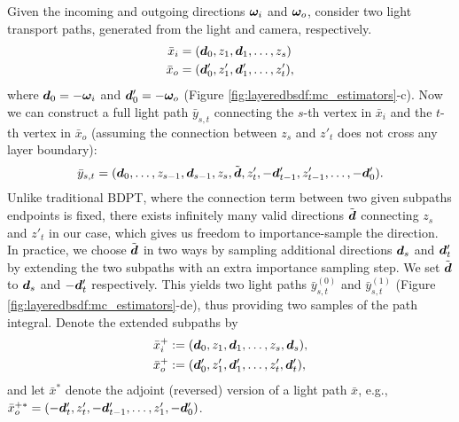 Given the incoming and outgoing directions $\bm{\omega}_i$ and $\bm{\omega}_o$, consider two light transport paths, generated from the light and camera, respectively.
\begin{equation}
	\begin{aligned}
	\bar{x}_i &= (\bm{d}_0, z_1, \bm{d}_1, \ldots, z_s) \\
	\bar{x}_o &= (\bm{d}'_0, z'_1, \bm{d}'_1, \ldots, z_t'),
	\end{aligned}
\end{equation}
where $\bm{d}_0 = -\bm{\omega}_i$ and $\bm{d}'_0 = -\bm{\omega}_o$ (Figure \ref{fig:layeredbsdf:mc_estimators}-c).
Now we can construct a full light path $\bar{y}_{s, t}$ connecting the $s$-th vertex in $\bar{x}_i$ and the $t$-th vertex in $\bar{x}_o$ (assuming the connection between $z_s$ and $z'_t$ does not cross any layer boundary):
\begin{equation}
	\bar{y}_{s, t} = (\bm{d}_0, \ldots, z_{s - 1}, \bm{d}_{s - 1}, z_s, \tilde{\bm{d}}, z'_t, -\bm{d}'_{t - 1}, z'_{t - 1}, \ldots, -\bm{d}'_0).
\end{equation}
Unlike traditional BDPT, where the connection term between two given subpaths endpoints is fixed, there exists infinitely many valid directions $\tilde{\bm{d}}$ connecting $z_s$ and $z'_t$ in our case, which gives us freedom to importance-sample the direction. In practice, we choose $\tilde{\bm{d}}$ in two ways by sampling additional directions $\bm{d}_s$ and $\bm{d}'_t$ by extending the two subpaths with an extra importance sampling step. We set $\tilde{\bm{d}}$ to $\bm{d}_s$ and $-\bm{d}'_t$ respectively. This yields two light paths $\bar{y}^{(0)}_{s, t}$ and $\bar{y}^{(1)}_{s, t}$ (Figure \ref{fig:layeredbsdf:mc_estimators}-de), thus providing two samples of the path integral.
Denote the extended subpaths by
\begin{align}
	\bar{x}_i^+ &:= (\bm{d}_0, z_1, \bm{d}_1, \ldots, z_s, \bm{d}_s),\\
	\bar{x}_o^+ &:= (\bm{d}'_0, z'_1, \bm{d}'_1, \ldots, z'_t, \bm{d}'_t),
\end{align}
and let $\bar{x}^*$ denote the adjoint (reversed) version of a light path $\bar{x}$, e.g., \\$\bar{x}_o^{+*} = (-\bm{d}'_t, z'_t, -\bm{d}'_{t - 1}, \ldots, z'_1, -\bm{d}'_0)$.

